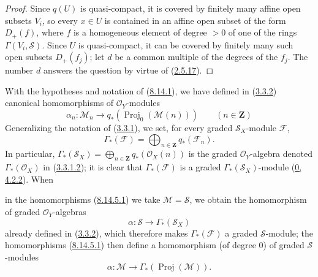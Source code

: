 \begin{proof}
Since $q(U)$ is quasi-compact, it is covered by finitely many affine open
subsets $V_i$, so every $x\in U$ is contained in an affine open subset of the
form $D_+(f)$, where $f$ is a homogeneous element of degree $>0$ of one of the
rings $\Gamma(V_i,\mathcal{S})$. Since $U$ is quasi-compact, it can be
covered by finitely many such open subsets $D_+(f_j)$; let $d$ be a
common multiple of the degrees of the $f_j$. The number $d$ answers the
question by virtue of (\hyperref[II.2.5.17]{2.5.17}).
\end{proof}

\begin{env}[8.14.5]
\label{II.8.14.5}
With the hypotheses and notation of (\hyperref[II.8.14.1]{8.14.1}), we
have defined in (\hyperref[II.3.3.2]{3.3.2}) canonical homomorphisms of
$\mathcal{O}_Y$-modules
\begin{equation}
\label{II.8.14.5.1}
  \alpha_n:\mathcal{M}_n\to
  q_*(\operatorname{Proj}_0(\mathcal{M}(n)))
  \qquad(n\in\mathbf{Z})
\tag{8.14.5.1}
\end{equation}
Generalizing the notation of (\hyperref[II.3.3.1]{3.3.1}), we
set, for every graded $\mathcal{S}_X$-module $\mathcal{F}$,
\begin{equation}
\label{II.8.14.5.2}
  \Gamma_*(\mathcal{F})=
  \bigoplus_{n\in\mathbf{Z}}q_*(\mathcal{F}_n).
\tag{8.14.5.2}
\end{equation}
In particular,
$\Gamma_*(\mathcal{S}_X)=\bigoplus_{n\in\mathbf{Z}}q_*(\mathcal{O}_X(n))$
is the graded $\mathcal{O}_Y$-algebra denoted
$\Gamma_*(\mathcal{O}_X)$ in
(\hyperref[II.3.3.1.2]{3.3.1.2}); it is clear that
$\Gamma_*(\mathcal{F})$ is a graded $\Gamma_*(\mathcal{S}_X)$-module
(\hyperref[0.4.2.2]{0, 4.2.2}). When

in the homomorphisms (\hyperref[II.8.14.5.1]{8.14.5.1}) we take
$\mathcal{M}=\mathcal{S}$, we obtain the homomorphism of
graded $\mathcal{O}_Y$-algebras
\begin{equation}
\label{II.8.14.5.3}
  \alpha:\mathcal{S}\to\Gamma_*(\mathcal{S}_X)
\tag{8.14.5.3}
\end{equation}
already defined in (\hyperref[II.3.3.2]{3.3.2}), which therefore makes
$\Gamma_*(\mathcal{F})$ a graded $\mathcal{S}$-module; the homomorphisms
(\hyperref[II.8.14.5.1]{8.14.5.1}) then define a homomorphism (of
degree $0$) of graded $\mathcal{S}$-modules
\begin{equation}
\label{II.8.14.5.4}
  \alpha:\mathcal{M}\to\Gamma_*(\operatorname{Proj}(\mathcal{M})).
\tag{8.14.5.4}
\end{equation}
\end{env}

